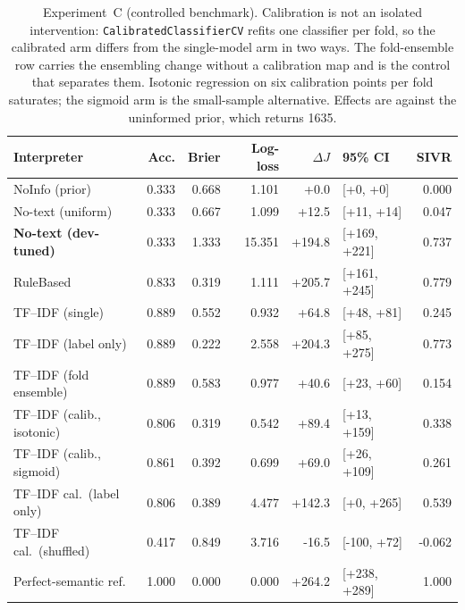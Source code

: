 \begin{table}[t]
\caption{Experiment~C (controlled benchmark). Calibration is not an isolated
intervention: \texttt{CalibratedClassifierCV} refits one classifier per fold,
so the calibrated arm differs from the single-model arm in two ways. The
fold-ensemble row carries the ensembling change without a calibration map and
is the control that separates them. Isotonic regression on six calibration
points per fold saturates; the sigmoid arm is the small-sample alternative.
Effects are against the uninformed prior, which returns 1635.}
\label{tab:calibration}
\centering\footnotesize\setlength{\tabcolsep}{3pt}
\begin{tabular}{l rrr rlr}
\toprule
Interpreter & Acc. & Brier & Log-loss & $\Delta J$ & 95\% CI & SIVR \\
\midrule
NoInfo (prior) & 0.333 & 0.668 & 1.101 & +0.0 & [+0, +0] & 0.000 \\
No-text (uniform) & 0.333 & 0.667 & 1.099 & +12.5 & [+11, +14] & 0.047 \\
\textbf{No-text (dev-tuned)} & 0.333 & 1.333 & 15.351 & +194.8 & [+169, +221] & 0.737 \\
RuleBased & 0.833 & 0.319 & 1.111 & +205.7 & [+161, +245] & 0.779 \\
TF--IDF (single) & 0.889 & 0.552 & 0.932 & +64.8 & [+48, +81] & 0.245 \\
TF--IDF (label only) & 0.889 & 0.222 & 2.558 & +204.3 & [+85, +275] & 0.773 \\
TF--IDF (fold ensemble) & 0.889 & 0.583 & 0.977 & +40.6 & [+23, +60] & 0.154 \\
TF--IDF (calib., isotonic) & 0.806 & 0.319 & 0.542 & +89.4 & [+13, +159] & 0.338 \\
TF--IDF (calib., sigmoid) & 0.861 & 0.392 & 0.699 & +69.0 & [+26, +109] & 0.261 \\
TF--IDF cal.\ (label only) & 0.806 & 0.389 & 4.477 & +142.3 & [+0, +265] & 0.539 \\
TF--IDF cal.\ (shuffled) & 0.417 & 0.849 & 3.716 & -16.5 & [-100, +72] & -0.062 \\
Perfect-semantic ref. & 1.000 & 0.000 & 0.000 & +264.2 & [+238, +289] & 1.000 \\
\bottomrule
\end{tabular}
\end{table}
